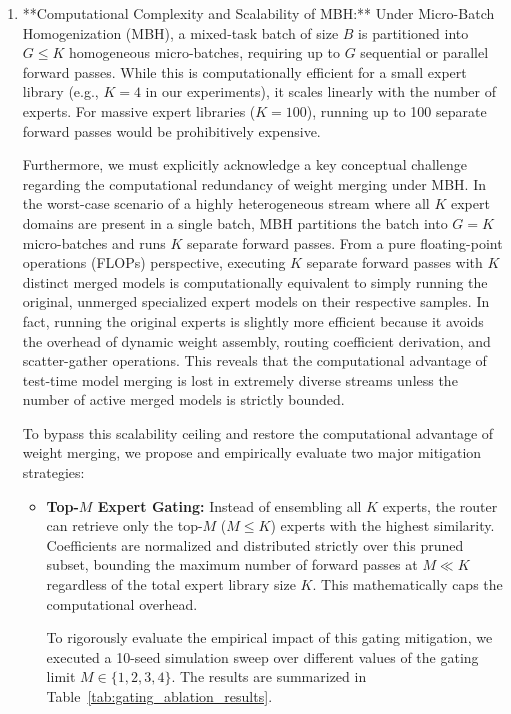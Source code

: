 \begin{enumerate}
    \item **Computational Complexity and Scalability of MBH:**
    Under Micro-Batch Homogenization (MBH), a mixed-task batch of size $B$ is partitioned into $G \le K$ homogeneous micro-batches, requiring up to $G$ sequential or parallel forward passes. While this is computationally efficient for a small expert library (e.g., $K=4$ in our experiments), it scales linearly with the number of experts. For massive expert libraries ($K=100$), running up to 100 separate forward passes would be prohibitively expensive.
    
    Furthermore, we must explicitly acknowledge a key conceptual challenge regarding the computational redundancy of weight merging under MBH. In the worst-case scenario of a highly heterogeneous stream where all $K$ expert domains are present in a single batch, MBH partitions the batch into $G = K$ micro-batches and runs $K$ separate forward passes. From a pure floating-point operations (FLOPs) perspective, executing $K$ separate forward passes with $K$ distinct merged models is computationally equivalent to simply running the original, unmerged specialized expert models on their respective samples. In fact, running the original experts is slightly more efficient because it avoids the overhead of dynamic weight assembly, routing coefficient derivation, and scatter-gather operations. This reveals that the computational advantage of test-time model merging is lost in extremely diverse streams unless the number of active merged models is strictly bounded.
    
    To bypass this scalability ceiling and restore the computational advantage of weight merging, we propose and empirically evaluate two major mitigation strategies:
    \begin{itemize}\setlength{\itemsep}{0.5pt}\setlength{\parskip}{0pt}
        \item \textbf{Top-$M$ Expert Gating:} Instead of ensembling all $K$ experts, the router can retrieve only the top-$M$ ($M \le K$) experts with the highest similarity. Coefficients are normalized and distributed strictly over this pruned subset, bounding the maximum number of forward passes at $M \ll K$ regardless of the total expert library size $K$. This mathematically caps the computational overhead. 
        
        To rigorously evaluate the empirical impact of this gating mitigation, we executed a 10-seed simulation sweep over different values of the gating limit $M \in \{1, 2, 3, 4\}$. The results are summarized in Table~\ref{tab:gating_ablation_results}.
        

\end{itemize}
\end{enumerate}
